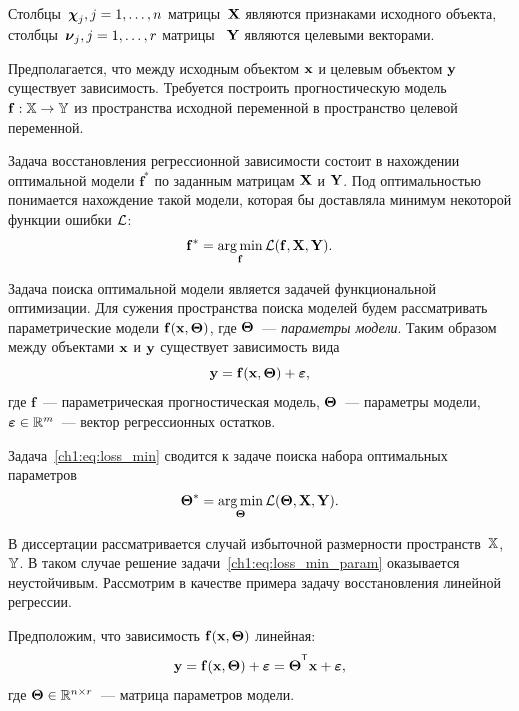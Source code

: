 \documentclass[11pt, a5paper]{dissert}
\begin{document}
Столбцы~$\boldsymbol{\chi}_j, j=1, \dots, n$ матрицы~$\mathbf{X}$ являются признаками исходного объекта, столбцы~$\boldsymbol{\nu}_j, j=1, \dots, r$ матрицы ~$\mathbf{Y}$ являются целевыми векторами.

Предполагается, что между исходным объектом $\mathbf{x}$ и целевым объектом $\mathbf{y}$ существует зависимость. Требуется построить прогностическую модель $\mathbf{f}: \mathbb{X} \rightarrow \mathbb{Y}$ из пространства исходной переменной в пространство целевой переменной.

Задача восстановления регрессионной зависимости состоит в нахождении оптимальной модели $\mathbf{f}^*$ по заданным матрицам $\mathbf{X}$ и $\mathbf{Y}$. Под оптимальностью понимается нахождение такой модели, которая бы доставляла минимум некоторой функции ошибки $\mathcal{L}$:
\begin{equation}
	\mathbf{f}^* = \mathop{\arg \min}\limits_\mathbf{f} \mathcal{L}(\mathbf{f}, \mathbf{X}, \mathbf{Y}).
	\label{ch1:eq:loss_min}
\end{equation}

Задача поиска оптимальной модели является задачей функциональной оптимизации. 
Для сужения пространства поиска моделей будем рассматривать параметрические модели $\mathbf{f}(\mathbf{x}, \boldsymbol{\Theta})$, где $\boldsymbol{\Theta}$~--- \textit{параметры модели}. 
Таким образом между объектами $\mathbf{x}$ и $\mathbf{y}$ существует зависимость вида
\begin{equation}
	\mathbf{y} = \mathbf{f}(\mathbf{x}, \boldsymbol{\Theta}) + \boldsymbol{\varepsilon},
	\label{ch1:eq:reg_model}
\end{equation}
где $\mathbf{f}$~--- параметрическая прогностическая модель, $\boldsymbol{\Theta}$~--- параметры модели, $\boldsymbol{\varepsilon} \in \mathbb{R}^{m}$~--- вектор регрессионных остатков. 

Задача~\eqref{ch1:eq:loss_min} сводится к задаче поиска набора оптимальных параметров
\begin{equation}
	\boldsymbol{\Theta}^* = \mathop{\arg \min}\limits_{\boldsymbol{\Theta}} \mathcal{L}(\boldsymbol{\Theta}, \mathbf{X}, \mathbf{Y}).
	\label{ch1:eq:loss_min_param}
\end{equation}

В диссертации рассматривается случай избыточной размерности пространств~$\mathbb{X}$, $\mathbb{Y}$. 
В таком случае решение задачи~\eqref{ch1:eq:loss_min_param} оказывается неустойчивым. 
Рассмотрим в качестве примера задачу восстановления линейной регрессии.

Предположим, что зависимость $\mathbf{f}(\mathbf{x}, \boldsymbol{\Theta})$ линейная:
\begin{equation}
	\by = \mathbf{f}(\bx, \bTheta) + \bepsilon = \bTheta^{\T} \bx+ \bepsilon,
	\label{ch1:eq:lin_reg_model}
\end{equation}
\noindent где $\boldsymbol{\Theta} \in \mathbb{R}^{n \times r}$~--- матрица параметров модели.
\end{document}
